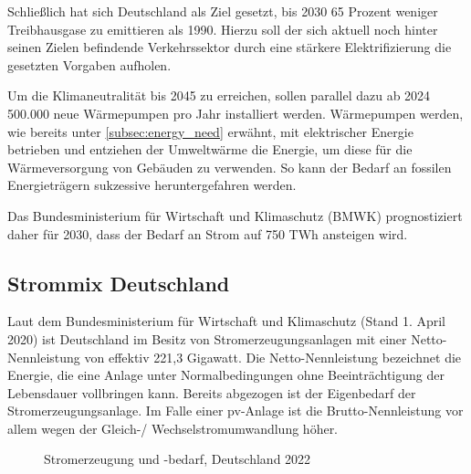 \documentclass[12pt, a4paper]{article}
\begin{document}
Schließlich hat sich Deutschland als Ziel gesetzt, bis 2030 65 Prozent weniger Treibhausgase zu emittieren als 1990. Hierzu soll der sich aktuell noch hinter seinen Zielen befindende Verkehrssektor durch eine stärkere Elektrifizierung die gesetzten Vorgaben aufholen.

Um die Klimaneutralität bis 2045 zu erreichen, sollen parallel dazu ab 2024 500.000 neue Wärmepumpen pro Jahr installiert werden. Wärmepumpen werden, wie bereits unter \autoref{subsec:energy_need} erwähnt, mit elektrischer Energie betrieben und entziehen der Umweltwärme die Energie, um diese für die Wärmeversorgung von Gebäuden zu verwenden. So kann der Bedarf an fossilen Energieträgern sukzessive heruntergefahren werden.

Das Bundesministerium für Wirtschaft und Klimaschutz (BMWK) prognostiziert daher für 2030, dass der Bedarf an Strom auf 750 TWh ansteigen wird.

\subsection{Strommix Deutschland}

Laut dem Bundesministerium für Wirtschaft und Klimaschutz (Stand 1. April 2020) ist Deutschland im Besitz von Stromerzeugungsanlagen mit einer Netto-Nennleistung von effektiv 221,3 Gigawatt. Die Netto-Nennleistung bezeichnet die Energie, die eine Anlage unter Normalbedingungen ohne Beeinträchtigung der Lebensdauer vollbringen kann. Bereits abgezogen ist der Eigenbedarf der Stromerzeugungsanlage. Im Falle einer \ac{pv}-Anlage ist die Brutto-Nennleistung vor allem wegen der Gleich-/ Wechselstromumwandlung höher. 

\begin{figure}
\centering
\def\svgwidth{450pt}
\fontsize{7}{10}\selectfont

\caption{Stromerzeugung und -bedarf, Deutschland 2022}
\label{fig:stromerzeugung_de_2022}
\end {figure}
\end{document}
